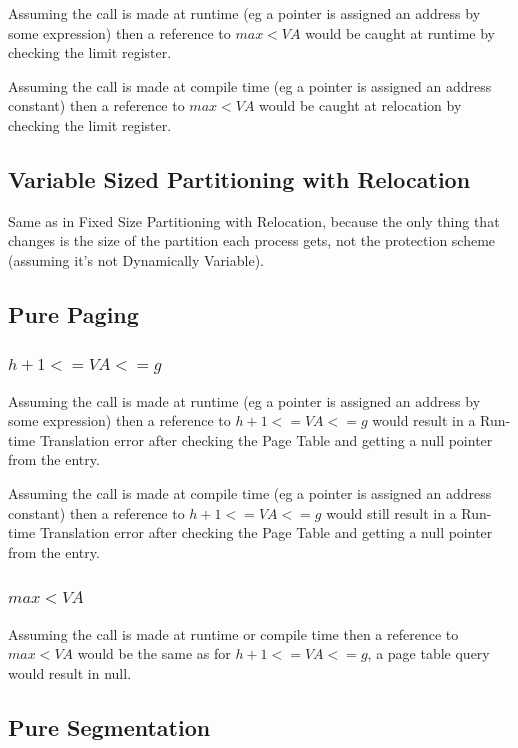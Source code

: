 \documentclass[11pt]{article} %
\begin{document}
Assuming the call is made at runtime (eg a pointer is assigned an address by some expression) then a reference to $max < VA$ would be caught at runtime by checking the limit register.

\bigskip
\noindent Assuming the call is made at compile time (eg a pointer is assigned an address constant) then a reference to $max < VA$ would be caught at relocation by checking the limit register.


\subsection*{Variable Sized Partitioning with Relocation}

Same as in Fixed Size Partitioning with Relocation, because the only thing that changes is the size of the partition each process gets, not the protection scheme (assuming it's not Dynamically Variable).

\subsection*{Pure Paging}

\subsubsection*{$h+1 <= VA <= g$}

Assuming the call is made at runtime (eg a pointer is assigned an address by some expression) then a reference to $h+1 <= VA <= g$ would result in a Run-time Translation error after checking the Page Table and getting a null pointer from the entry.

\bigskip

\noindent Assuming the call is made at compile time (eg a pointer is assigned an address constant) then a reference to $h+1 <= VA <= g$ would still result in a Run-time Translation error after checking the Page Table and getting a null pointer from the entry.

\subsubsection*{$max < VA $}

Assuming the call is made at runtime or compile time then a reference to $max < VA$ would be the same as for $h+1 <= VA <= g$, a page table query would result in null.

\subsection*{Pure Segmentation}
\end{document}
